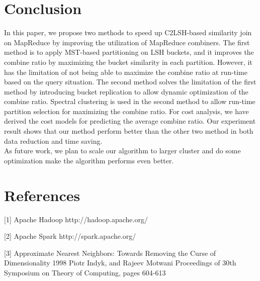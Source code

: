 \documentclass{vldb}
\begin{document}
\section{Conclusion}
In this paper, we propose two methods to speed up C2LSH-based similarity join on MapReduce by improving the utilization of MapReduce combiners. The first method is to apply MST-based partitioning on LSH buckets, and it improves the combine ratio by maximizing the bucket similarity in each partition. However, it has the limitation of not being able to maximize the combine ratio at run-time based on the query situation. The second method solves the limitation of the first method by introducing bucket replication to allow dynamic optimization of the combine ratio. Spectral clustering is used in the second method to allow run-time partition selection for maximizing the combine ratio. For cost analysis, we have derived the cost models for predicting the average combine ratio. Our experiment result shows that our method perform better than the other two method in both data reduction and time saving.\\
As future work, we plan to scale our algorithm to larger cluster and do some optimization make the algorithm performs even better.


\balance






\section{References}
[1] Apache Hadoop http://hadoop.apache.org/

[2] Apache Spark http://spark.apache.org/

[3] Approximate Nearest Neighbors: Towards Removing the Curse of Dimensionality 1998 Piotr Indyk, and Rajeev Motwani Proceedings of 30th Symposium on Theory of Computing, pages 604-613
\end{document}
